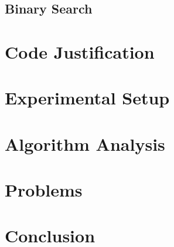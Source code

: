 \documentclass{article}
\begin{document}
    \subsection{Binary Search}
    
    \section{Code Justification}
    \section{Experimental Setup}
    \section{Algorithm Analysis}
    \section{Problems}
    \section{Conclusion}
    
\end{document}
